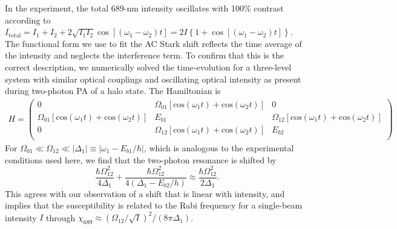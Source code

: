 In the experiment, the total 689-nm intensity oscillates with 100\% contrast according to $I_{\text{total}}=I_1+I_2+2\sqrt{I_1I_2}\cos \left[(\omega_1-\omega_2)t \right]=2I\left\{1+\cos \left[(\omega_1-\omega_2)t \right]\right\}$. The functional form we use to fit the AC Stark shift reflects the time average of the intensity and neglects the interference term. To confirm that this is the correct description, we numerically solved the time-evolution for a three-level system with similar optical couplings and oscillating optical intensity as present during two-photon PA of a halo state. The Hamiltonian is
\begin{eqnarray}
H=
\left(
    \begin{array}{ccc}
      0 & \Omega_{01}\left[\mathrm{cos}(\omega_1 t)+ \mathrm{cos}(\omega_2 t)\right] & 0 \\
      \Omega_{01}\left[\mathrm{cos}(\omega_1 t)+ \mathrm{cos}(\omega_2 t)\right] & E_{b1} & \Omega_{12}\left[\mathrm{cos}(\omega_1 t)+ \mathrm{cos}(\omega_2 t)\right] \\
      0 & \Omega_{12}\left[\mathrm{cos}(\omega_1 t)+ \mathrm{cos}(\omega_2 t)\right] & E_{b2} \\
    \end{array}
  \right)
\nonumber
\end{eqnarray}
For $\Omega_{01}\ll \Omega_{12} \ll |\Delta_{1}|\equiv |\omega_1-E_{b1}/\hbar|$, which is analogous to the experimental conditions used here, we find that the two-photon resonance is shifted by
\begin{equation}\label{Eq:ACStarkFullModel}
\frac{\hbar\Omega_{12}^{2}}{4\Delta_{1}}+\frac{\hbar\Omega_{12}^{2}}{4\left(\Delta_{1}-E_{b2}/h\right)}\approx
\frac{\hbar\Omega_{12}^{2}}{2\Delta_{1}}.
\end{equation}
This agrees with our observation of a shift that is linear with intensity, and implies that the susceptibility is related to the Rabi frequency for a single-beam intensity $I$ through $\chi_{689}\approx(\Omega_{12}/\sqrt{I})^2/(8\pi \Delta_1)$.




